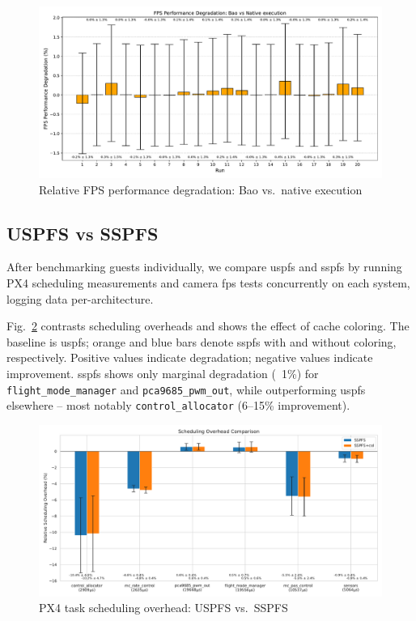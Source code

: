 \begin{figure}[!hbt]
  \centering
  \includegraphics[width=1.0\textwidth]{./img/pdf/fps-cmp} 
  \caption{Relative FPS performance degradation: Bao vs.\ native execution}%
  \label{fig:fps-cmp}
\end{figure}

\subsection{USPFS vs SSPFS}
\label{sec:uspfs-vs-sspfs}
After benchmarking guests individually, we compare \gls{uspfs} and \gls{sspfs} by running PX4 scheduling measurements and camera \gls{fps} tests concurrently on each system, logging data per-architecture.

Fig.~\ref{fig:px4-sspfs-uspfs} contrasts scheduling overheads and shows the
effect of cache coloring. The baseline is \gls{uspfs}; orange and blue bars
denote \gls{sspfs} with and without coloring, respectively. Positive values
indicate degradation; negative values indicate improvement. \gls{sspfs} shows
only marginal degradation (~1\%) for \lstinline{flight_mode_manager} and
\lstinline{pca9685_pwm_out}, while outperforming \gls{uspfs} elsewhere -- most
notably \lstinline{control_allocator} (6–15\% improvement).

\begin{figure}[!hbt]
  \centering
  \includegraphics[width=1.0\textwidth]{./img/pdf/px4-sspfs-uspfs} 
  \caption{PX4 task scheduling overhead: USPFS vs.\ SSPFS}%
  \label{fig:px4-sspfs-uspfs}
\end{figure}

